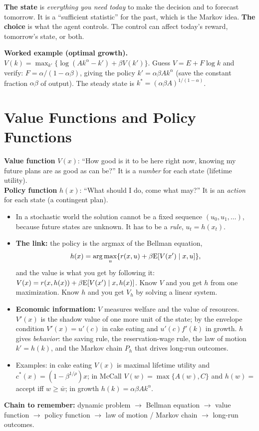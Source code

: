 \documentclass[10pt]{article}
\begin{document}
\textbf{The state} is \emph{everything you need today} to make the decision and to forecast tomorrow. It is a ``sufficient statistic'' for the past, which is the Markov idea. \textbf{The choice} is what the agent controls. The control can affect today's reward, tomorrow's state, or both.

\textbf{Worked example (optimal growth).} $V(k)=\max_{k'}\{\log(Ak^\alpha-k')+\beta V(k')\}$. Guess $V=E+F\log k$ and verify: $F=\alpha/(1-\alpha\beta)$, giving the policy $k'=\alpha\beta Ak^\alpha$ (save the constant fraction $\alpha\beta$ of output). The steady state is $k^*=(\alpha\beta A)^{1/(1-\alpha)}$.

\section{Value Functions and Policy Functions}

\begin{bigidea}
\textbf{Value function} $V(x)$: ``How good is it to be here right now, knowing my future plans are as good as can be?'' It is a \emph{number} for each state (lifetime utility).\\
\textbf{Policy function} $h(x)$: ``What should I do, come what may?'' It is an \emph{action} for each state (a contingent plan).
\end{bigidea}

\begin{itemize}
\item In a stochastic world the solution cannot be a fixed sequence $(u_0,u_1,\dots)$, because future states are unknown. It has to be a \emph{rule}, $u_t=h(x_t)$.
\item \textbf{The link:} the policy is the argmax of the Bellman equation, \[h(x)=\arg\max_u\{r(x,u)+\beta\mathrm{E}[V(x')\mid x,u]\},\] and the value is what you get by following it: $V(x)=r(x,h(x))+\beta\mathrm{E}[V(x')\mid x,h(x)]$. Know $V$ and you get $h$ from one maximization. Know $h$ and you get $V_h$ by solving a linear system.
\item \textbf{Economic information:} $V$ measures welfare and the value of resources. $V'(x)$ is the shadow value of one more unit of the state; by the envelope condition $V'(x)=u'(c)$ in cake eating and $u'(c)f'(k)$ in growth. $h$ gives \emph{behavior}: the saving rule, the reservation-wage rule, the law of motion $k'=h(k)$, and the Markov chain $P_h$ that drives long-run outcomes.
\item Examples: in cake eating $V(x)$ is maximal lifetime utility and $c^*(x)=(1-\beta^{1/\rho})x$; in McCall $V(w)=\max\{A(w),C\}$ and $h(w)=$ accept iff $w\ge\bar w$; in growth $h(k)=\alpha\beta Ak^\alpha$.
\end{itemize}
\textbf{Chain to remember:} dynamic problem $\to$ Bellman equation $\to$ value function $\to$ policy function $\to$ law of motion / Markov chain $\to$ long-run outcomes.
\end{document}
